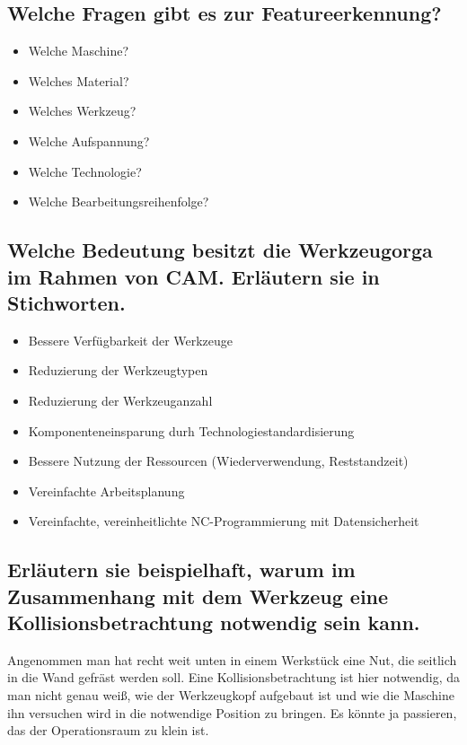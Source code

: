 \subsection*{Welche Fragen gibt es zur Featureerkennung?}

\begin{itemize}
    \item Welche Maschine?
    \item Welches Material?
    \item Welches Werkzeug?
    \item Welche Aufspannung?
    \item Welche Technologie?
    \item Welche Bearbeitungsreihenfolge?
\end{itemize}

\subsection*{%
    Welche Bedeutung besitzt die Werkzeugorga im Rahmen von CAM. Erläutern sie
    in Stichworten.
}

\begin{itemize}
    \item Bessere Verfügbarkeit der Werkzeuge
    \item Reduzierung der Werkzeugtypen
    \item Reduzierung der Werkzeuganzahl
    \item Komponenteneinsparung durh Technologiestandardisierung
    \item Bessere Nutzung der Ressourcen (Wiederverwendung, Reststandzeit)
    \item Vereinfachte Arbeitsplanung
    \item Vereinfachte, vereinheitlichte NC-Programmierung mit Datensicherheit
\end{itemize}

\subsection*{%
    Erläutern sie beispielhaft, warum im Zusammenhang mit dem Werkzeug eine
    Kollisionsbetrachtung notwendig sein kann.
}

Angenommen man hat recht weit unten in einem Werkstück eine Nut, die seitlich
in die Wand gefräst werden soll. Eine Kollisionsbetrachtung ist hier notwendig,
da man nicht genau weiß, wie der Werkzeugkopf aufgebaut ist und wie die
Maschine ihn versuchen wird in die notwendige Position zu bringen. Es könnte ja
passieren, das der Operationsraum zu klein ist.


